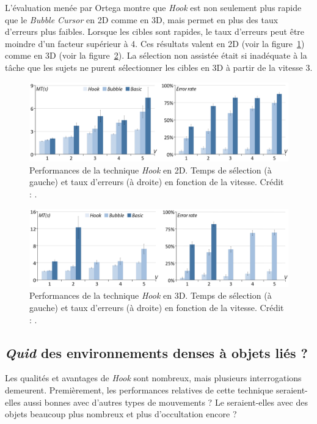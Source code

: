 	L'évaluation menée par Ortega montre que \emph{Hook} est non seulement plus rapide que le \emph{Bubble Cursor} en 2D comme en 3D, mais permet en plus des taux d'erreurs plus faibles. Lorsque les cibles sont rapides, le taux d'erreurs peut être moindre d'un facteur supérieur à 4. Ces résultats valent en 2D (voir la figure~\ref{fig:hookRes2d}) comme en 3D (voir la figure~\ref{fig:hookRes3d}). La sélection non assistée était si inadéquate à la tâche que les sujets ne purent sélectionner les cibles en 3D à partir de la vitesse 3.

	\begin{figure}[!htb]
		\centering
		\includegraphics[width=\textwidth]{figures/ch2/hookRes2d}
		\caption[\emph{Hook} -- performances en 2D]{Performances de la technique \emph{Hook} en 2D. Temps de sélection (à gauche) et taux d'erreurs (à droite) en fonction de la vitesse. Crédit : \cite{ortega2013hook}.}
		\label{fig:hookRes2d}
	\end{figure}
	
	\begin{figure}[!htb]
		\centering
		\includegraphics[width=\textwidth]{figures/ch2/hookRes3d}
		\caption[\emph{Hook} -- performances en 2D]{Performances de la technique \emph{Hook} en 3D. Temps de sélection (à gauche) et taux d'erreurs (à droite) en fonction de la vitesse. Crédit : \cite{ortega2013hook}.}
		\label{fig:hookRes3d}
	\end{figure}
	
	\subsection{\emph{Quid} des environnements denses à objets liés ?}
	Les qualités et avantages de \emph{Hook} sont nombreux, mais plusieurs interrogations demeurent. Premièrement, les performances relatives de cette technique seraient-elles aussi bonnes avec d'autres types de mouvements ? Le seraient-elles avec des objets beaucoup plus nombreux et plus d'occultation encore ?
	

